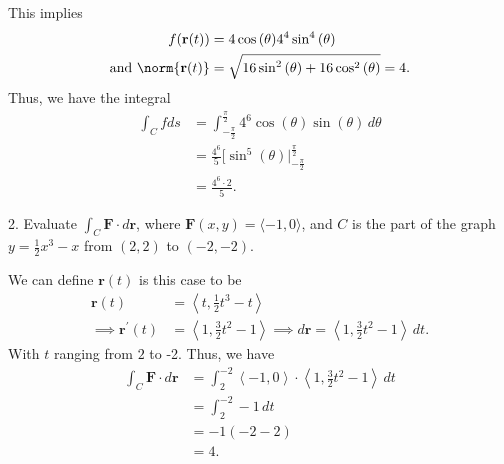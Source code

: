 \documentclass{report}
\begin{document}
    \bigbreak \noindent 
    This implies 
    \begin{align*}
        f(\mathbf{r}(t)) &= 4\cos{\left(\theta \right)}4^{4}\sin^{4}{\left(\theta \right)} \\
        \text{and } \norm{\mathbf{r}(t)} &= \sqrt{16\sin^{2}{\left(\theta \right)} + 16\cos^{2}{\left(\theta \right)}} = 4
    .\end{align*}
    Thus, we have the integral
    \begin{align*}
        \int_C fds &= \int_{-\frac{\pi}{2}}^{\frac{\pi}{2}}4^{6}\cos{\left(\theta    \right)}\sin{\left(\theta \right)}\, d\theta  \\
                   &=\frac{4^{6}}{5}\bigg[\sin^{5}{\left(\theta \right)}\bigg|_{-\frac{\pi}{2}}^{\frac{\pi}{2}} \\
                   &= \frac{4^{6} \cdot 2}{5}
    .\end{align*}

    

    \bigbreak \noindent 
    \begin{mdframed}
        2. Evaluate $\int_C \mathbf{F} \cdot d\mathbf{r}$, where \(\mathbf{F}(x, y) = \langle -1, 0 \rangle\), and \(C\) is the part of the graph \(y = \frac{1}{2}x^3 - x\) from \((2, 2)\) to \((-2, -2)\).
    \end{mdframed}
    \bigbreak \noindent 
    We can define $\mathbf{r}(t)$ is this case to be 
    \begin{align*}
        \mathbf{r}(t) &= \left\langle t, \frac{1}{2}t^{3} -t  \right\rangle \\
        \implies \mathbf{r}^{\prime}(t) &= \left\langle 1, \frac{3}{2}t^{2} - 1 \right\rangle
        \implies d\mathbf{r} = \left\langle 1, \frac{3}{2}t^{2}-1 \right\rangle \,dt
    .\end{align*}
    \bigbreak \noindent 
    With $t$ ranging from $2$ to -2. Thus, we have
    \begin{align*}
        \int_C \mathbf{F} \cdot d\mathbf{r} &= \int_{2}^{-2}\left\langle -1,0 \right\rangle \cdot \left\langle 1,\frac{3}{2}t^{2}-1 \right\rangle \,dt \\
        &=\int_{2}^{-2}  -1\, dt \\
        &=-1(-2-2) \\
        &=4
    .\end{align*}
\end{document}
